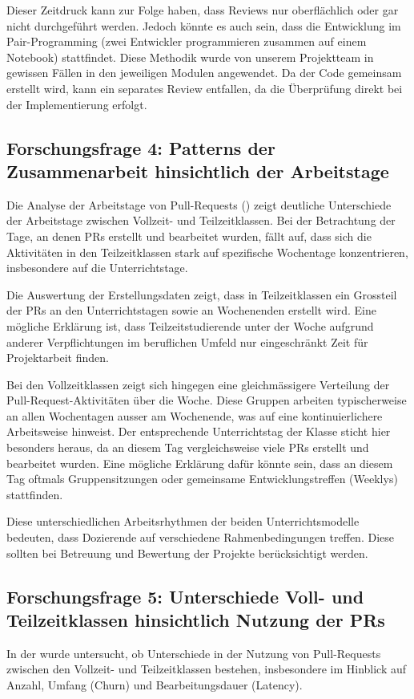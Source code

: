 Dieser Zeitdruck kann zur Folge haben, dass Reviews nur oberflächlich oder gar nicht durchgeführt werden. Jedoch könnte es auch sein, dass die Entwicklung im Pair-Programming (zwei Entwickler programmieren zusammen auf einem Notebook) stattfindet. Diese Methodik wurde von unserem Projektteam in gewissen Fällen in den jeweiligen Modulen angewendet. Da der Code gemeinsam erstellt wird, kann ein separates Review entfallen, da die Überprüfung direkt bei der Implementierung erfolgt.


\subsection{Forschungsfrage 4: Patterns der Zusammenarbeit hinsichtlich der Arbeitstage}
Die Analyse der Arbeitstage von Pull-Requests () zeigt deutliche Unterschiede der Arbeitstage zwischen Vollzeit- und Teilzeitklassen. Bei der Betrachtung der Tage, an denen PRs erstellt und bearbeitet wurden, fällt auf, dass sich die Aktivitäten in den Teilzeitklassen stark auf spezifische Wochentage konzentrieren, insbesondere auf die Unterrichtstage. 

Die Auswertung der Erstellungsdaten zeigt, dass in Teilzeitklassen ein Grossteil der PRs an den Unterrichtstagen sowie an Wochenenden erstellt wird. Eine mögliche Erklärung ist, dass Teilzeitstudierende unter der Woche aufgrund anderer Verpflichtungen im beruflichen Umfeld nur eingeschränkt Zeit für Projektarbeit finden.

Bei den Vollzeitklassen zeigt sich hingegen eine gleichmässigere Verteilung der Pull-Request-Aktivitäten über die Woche. Diese Gruppen arbeiten typischerweise an allen Wochentagen ausser am Wochenende, was auf eine kontinuierlichere Arbeitsweise hinweist. Der entsprechende Unterrichtstag der Klasse sticht hier besonders heraus, da an diesem Tag vergleichsweise viele PRs erstellt und bearbeitet wurden. Eine mögliche Erklärung dafür könnte sein, dass an diesem Tag oftmals Gruppensitzungen oder gemeinsame Entwicklungstreffen (Weeklys) stattfinden. 

Diese unterschiedlichen Arbeitsrhythmen der beiden Unterrichtsmodelle bedeuten, dass Dozierende auf verschiedene Rahmenbedingungen treffen. Diese sollten bei Betreuung und Bewertung der Projekte berücksichtigt werden.

\subsection{Forschungsfrage 5: Unterschiede Voll- und Teilzeitklassen hinsichtlich Nutzung der PRs}
In der  wurde untersucht, ob Unterschiede in der Nutzung von Pull-Requests zwischen den Vollzeit- und Teilzeitklassen bestehen, insbesondere im Hinblick auf Anzahl, Umfang (Churn) und Bearbeitungsdauer (Latency).

